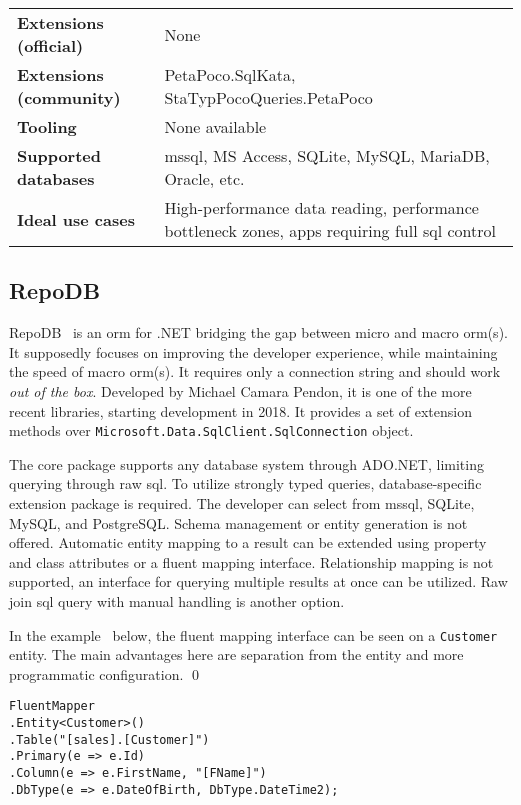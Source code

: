 {\begin{landscape}
\begin{table}[p]
\begin{tabular}{
>{\raggedright\arraybackslash}p{40.00mm}
>{\arraybackslash}p{150.00mm}
}
\textbf{Extensions (official)} & None \\
\textbf{Extensions (community)} & PetaPoco.SqlKata, StaTypPocoQueries.PetaPoco \\
\textbf{Tooling} & None available \\
\textbf{Supported databases} & \acrshort{mssql}, MS Access, SQLite, MySQL, MariaDB, Oracle, etc. \\
\textbf{Ideal use cases} & High-performance data reading, performance bottleneck zones, apps requiring full \acrshort{sql} control \\
\bottomrule
\end{tabular}
\end{table}
\end{landscape}
}



\subsection{RepoDB}
RepoDB~\cite{RepoDB, RepoDBRepo} is an \acrshort{orm} for .NET bridging the gap between micro and macro \acrshort{orm}(s). It supposedly focuses on improving the developer experience, while maintaining the speed of macro \acrshort{orm}(s). It requires only a connection string and should work \textit{out of the box}. Developed by Michael Camara Pendon, it is one of the more recent libraries, starting development in 2018. It provides a set of extension methods over \texttt{Microsoft.Data.SqlClient.SqlConnection} object. 

The core package supports any database system through ADO.NET, limiting querying through raw \acrshort{sql}. To utilize strongly typed queries, database-specific extension package is required. The developer can select from \acrshort{mssql}, SQLite, MySQL, and PostgreSQL. Schema management or entity generation is not offered. Automatic entity mapping to a result can be extended using property and class attributes or a fluent mapping interface. Relationship mapping is not supported, an interface for querying multiple results at once can be utilized. Raw join \acrshort{sql} query with manual handling is another option.

\begin{example}
\small
In the example~\cite{RepoDB} below, the fluent mapping interface can be seen on a \texttt{Customer} entity. The main advantages here are separation from the entity and more programmatic configuration.
\qed

\begin{lstlisting}[language=CSharp]
FluentMapper
.Entity<Customer>()
.Table("[sales].[Customer]")
.Primary(e => e.Id)
.Column(e => e.FirstName, "[FName]")
.DbType(e => e.DateOfBirth, DbType.DateTime2);
\end{lstlisting}
\end{example}

